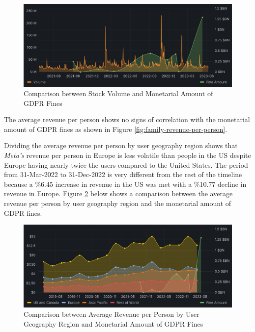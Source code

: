 \documentclass[12pt, a4paper]{article}
\begin{document}
\begin{figure}[H]
    \centering
    \includegraphics[width=1.00\textwidth]{rel-fines-volume}
    \caption{Comparison between Stock Volume and Monetarial Amount of GDPR Fines}
    \label{fig:rel-fines-volume}
\end{figure}

The average revenue per person shows no signs of correlation with the monetarial
amount of GDPR fines as shown in Figure \ref{fig:family-revenue-per-person}.

Dividing the average revenue per person by user geography region shows that
\textit{Meta's} revenue per person in Europe is less volatile than people in the
US despite Europe having nearly twice the users compared to the United
States\cite{2023q1}. The period from 31-Mar-2022 to 31-Dec-2022 is very
different from the rest of the timeline because a \%6.45 increase in revenue in
the US was met with a \%10.77 decline in revenue in Europe. Figure
\ref{fig:rel-fines-avg-revenue-per-person-region} below shows a comparison
between the average revenue per person by user geography region and the
monetarial amount of GDPR fines.

\begin{figure}[H]
    \centering
    \includegraphics[width=1.00\textwidth]{rel-fines-avg-revenue-per-person-region}
    \caption{Comparison between Average Revenue per Person by User Geography Region and Monetarial Amount of GDPR Fines}
    \label{fig:rel-fines-avg-revenue-per-person-region}
\end{figure}
\end{document}
